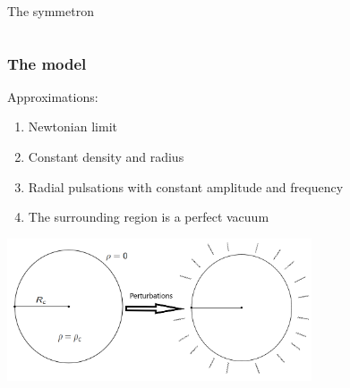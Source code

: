 \documentclass[10pt,t,handout]{beamer}
\begin{document}
\begin{frame}{The symmetron}
\begin{columns}[T]
\begin{column}{0.5\textwidth}
    \end{column}
    \end{columns}
    
\end{frame}

\begin{frame}
\frametitle{The model}
    Approximations:
\begin{enumerate}
    \item  Newtonian limit
    \item  Constant density and radius
    \item  Radial pulsations with constant amplitude and  frequency 
    \item  The surrounding region is a perfect vacuum 
    
\end{enumerate}
\vspace{5mm}
\centering \includegraphics[width=9cm]{Images/YE.png}
\end{frame}
\end{document}
